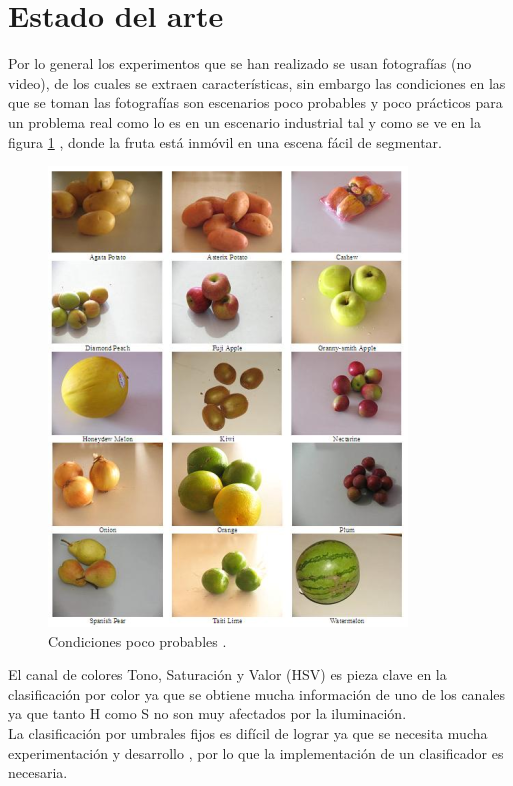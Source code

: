 \documentclass[twoside,spanish,ESP,MSc]{plantillaLabUPV}
\theoremstyle{definition}
\begin{document}
\section{Estado del arte}
Por lo general los experimentos que se han realizado se usan fotografías (no video), de los cuales se extraen características, sin embargo las condiciones en las que se toman las fotografías son escenarios poco probables y poco prácticos para un problema real como lo es en un escenario industrial tal y como se ve en la figura \ref{chafa} \cite{chafafrut}, donde la fruta está inmóvil en una escena fácil de segmentar.

 \begin{figure}[h]
\centering
\includegraphics*[scale=0.5]{datchafa} 
\caption{Condiciones poco probables \cite{chafafrut}.}
\label{chafa}
\end{figure}

El canal de colores Tono, Saturación y Valor (HSV) es pieza clave en la clasificación por color \cite{analis,chokun,rgbhisto,huehue,sugarhue} ya que se obtiene mucha información de uno de los canales ya que tanto H como S no son muy afectados por la iluminación.\\

La clasificación por umbrales fijos es difícil de lograr ya que se necesita mucha experimentación y desarrollo \cite{huehue,josu}, por lo que la implementación de un clasificador es necesaria.\\
\end{document}
